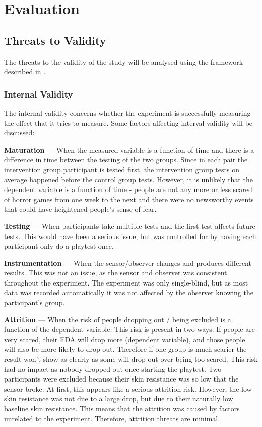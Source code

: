 \documentclass[12pt,a4paper]{article}\usepackage[]{graphicx}\usepackage[]{color}
\begin{document}
\section{Evaluation}
\label{sec:Evaluation}
\subsection{Threats to Validity}
\label{sec:Validity}
The threats to the validity of the study will be analysed using the framework described in \citet[pp. 5--6]{validity}.

\subsubsection{Internal Validity}
The internal validity concerns whether the experiment is successfully measuring the effect that it tries to measure. Some factors affecting interval validity will be discussed:

\textbf{Maturation} --- When the measured variable is a function of time and there is a difference in time between the testing of the two groups.
Since in each pair the intervention group participant is tested first, the intervention group tests on average happened before the control group tests.
However, it is unlikely that the dependent variable is a function of time - people are not any more or less scared of horror games from one week to the next and there were no newsworthy events that could have heightened people's sense of fear.

\textbf{Testing} --- When participants take multiple tests and the first test affects future tests.
This would have been a serious issue, but was controlled for by having each participant only do a playtest once.

\textbf{Instrumentation} --- When the sensor/observer changes and produces different results.
This was not an issue, as the sensor and observer was consistent throughout the experiment.
The experiment was only single-blind, but as most data was recorded automatically it was not affected by the observer knowing the participant's group.

\textbf{Attrition} --- When the risk of people dropping out / being excluded is a function of the dependent variable.
This risk is present in two ways.
If people are very scared, their EDA will drop more (dependent variable), and those people will also be more likely to drop out.
Therefore if one group is much scarier the result won't show as clearly as some will drop out over being too scared.
This risk had no impact as nobody dropped out once starting the playtest.
Two participants were excluded because their skin resistance was so low that the sensor broke.
At first, this appears like a serious attrition risk.
However, the low skin resistance was not due to a large drop, but due to their naturally low baseline skin resistance.
This means that the attrition was caused by factors unrelated to the experiment.
Therefore, attrition threats are minimal.
\end{document}
